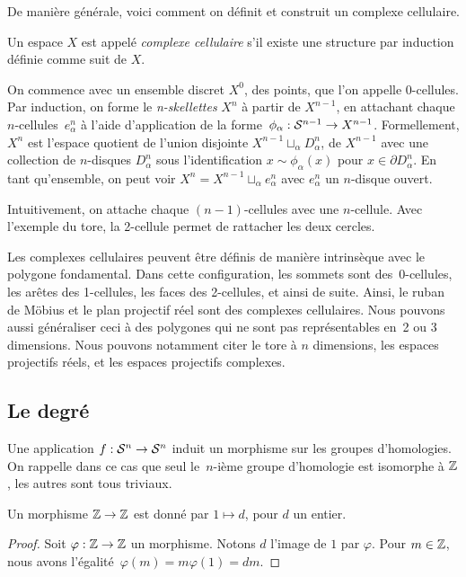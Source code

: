 De manière générale, voici comment on définit et construit un complexe cellulaire.

\begin{definition}
Un espace $X$ est appelé \emph{complexe cellulaire} s'il existe une structure par induction définie comme suit de $X$.

On commence avec un ensemble discret $X^0$, des points, que l'on appelle 0-cellules. Par induction, on forme le \emph{n-skellettes} $X^n$ à partir de $X^{n-1}$, en attachant chaque $n$-cellules~$e^n_\alpha$ à l'aide d'application de la forme~$\phi_\alpha:\mathcal{S}^{n-1}\to X^{n-1}$. Formellement, $X^n$ est l'espace quotient de l'union disjointe $X^{n-1}\sqcup_\alpha D^n_\alpha$, de $X^{n-1}$ avec une collection de $n$-disques $D^n_\alpha$ sous l'identification $x\sim \phi_\alpha(x)$ pour $x\in\partial D_\alpha^n$. En tant qu'ensemble, on peut voir $X^n=X^{n-1}\sqcup_\alpha e^n_\alpha$ avec $e_\alpha^n$ un $n$-disque ouvert.
\end{definition}

Intuitivement, on attache chaque $(n-1)$-cellules avec une $n$-cellule. Avec l'exemple du tore, la 2-cellule permet de rattacher les deux cercles.

\begin{exemple}
Les complexes cellulaires peuvent être définis de manière intrinsèque avec le polygone fondamental. Dans cette configuration, les sommets sont des~0-cellules, les arêtes des 1-cellules, les faces des 2-cellules, et ainsi de suite. Ainsi, le ruban de Möbius et le plan projectif réel sont des complexes cellulaires. Nous pouvons aussi généraliser ceci à des polygones qui ne sont pas représentables en~2 ou 3 dimensions. Nous pouvons notamment citer le tore à $n$ dimensions, les espaces projectifs réels, et les espaces projectifs complexes.
\end{exemple}

\subsection{Le degré}

Une application $f:\mathcal{S}^{n}\to \mathcal{S}^{n}$ induit un morphisme sur les groupes d'homologies. On rappelle dans ce cas que seul le~$n$-ième groupe d'homologie est isomorphe à $\mathbb{Z}$, les autres sont tous triviaux.

\begin{proposition}
Un morphisme $\mathbb{Z}\to\mathbb{Z}$ est donné par $1\mapsto d$, pour $d$ un entier.
\end{proposition}
\begin{proof}
Soit $\varphi:\mathbb{Z}\to\mathbb{Z}$ un morphisme. Notons $d$ l'image de $1$ par $\varphi$. Pour $m\in \mathbb{Z}$, nous avons l'égalité~$\varphi(m)=m\varphi(1)=dm$.
\end{proof}

